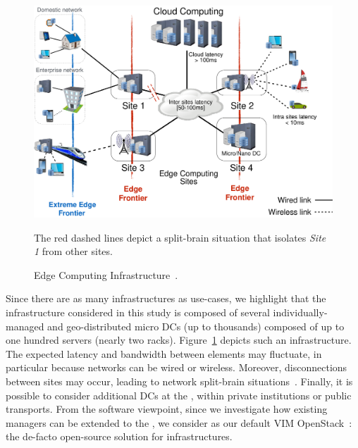 \begin{figure}[t]
  \centering
  \includegraphics[width=.95\columnwidth]{./figures/figure_fog.pdf}
    \vspace*{-.2cm}
  \caption{Edge Computing Infrastructure~\cite{7923796}.}
    {\small The red dashed lines depict a split-brain situation that isolates
    \emph{Site 1} from other sites.}
  \label{fig:fogedge-archi}
  \vspace*{-.3cm}
\end{figure}

Since there are as many \edge infrastructures as
use-cases, we highlight that the infrastructure considered in this study is
composed of several individually-managed and geo-distributed micro DCs (up to
thousands) composed of up to one hundred servers (nearly two racks).
Figure~\ref{fig:fogedge-archi} depicts such an infrastructure. The expected
latency and bandwidth between elements may fluctuate, in particular because
networks can be wired or wireless. Moreover, disconnections between sites may
occur, leading to network split-brain situations~\cite{4456903}.
Finally, it is possible to consider additional DCs at the \extremeedge, within private institutions or public transports.
%
From the software viewpoint, since we investigate how existing \cloud managers
can be extended to the \edge, we consider as our default VIM
OpenStack~\cite{openstack:www}: the de-facto open-source solution for
\cloudcomputing infrastructures.%

